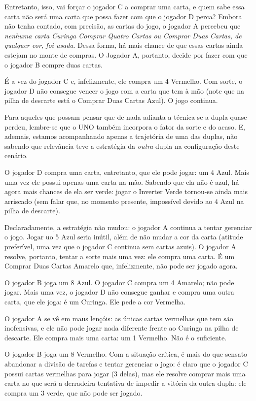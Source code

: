 Entretanto, isso, vai forçar o jogador C a comprar uma carta, e quem sabe essa carta não será uma carta que possa fazer com que o jogador D perca? Embora não tenha contado, com precisão, as cartas do jogo, o jogador A percebeu que \emph{nenhuma carta Curinga Comprar Quatro Cartas ou Comprar Duas Cartas, de qualquer cor, foi usada}. Dessa forma, há mais chance de que essas cartas ainda estejam no monte de compras. O Jogador A, portanto, decide por fazer com que o jogador B compre duas cartas.

É a vez do jogador C e, infelizmente, ele compra um 4 Vermelho. Com sorte, o jogador D não consegue vencer o jogo com a carta que tem à mão (note que na pilha de descarte está o Comprar Duas Cartas Azul). O jogo continua.

Para aqueles que possam pensar que de nada adianta a técnica se a dupla quase perdeu, lembre-se que o UNO também incorpora o fator da sorte e do acaso. E, ademais, estamos acompanhando apenas a trajetória de uma das duplas, não sabendo que relevância teve a estratégia da \emph{outra} dupla na configuração deste cenário.

O jogador D compra uma carta, entretanto, que ele pode jogar: um 4 Azul. Mais uma vez ele possui apenas uma carta na mão. Sabendo que ela não é azul, há agora mais chances de ela ser verde: jogar o Inverter Verde tornou-se ainda mais arriscado (sem falar que, no momento presente, impossível devido ao 4 Azul na pilha de descarte).

Declaradamente, a estratégia não mudou: o jogador A continua a tentar gerenciar o jogo. Jogar uo 5 Azul seria inútil, além de não mudar a cor da carta (atitude preferível, uma vez que o jogador C continua sem cartas azuis). O jogador A resolve, portanto, tentar a sorte mais uma vez: ele compra uma carta. É um Comprar Duas Cartas Amarelo que, infelizmente, não pode ser jogado agora.

O jogador B joga um 8 Azul. O jogador C compra um 4 Amarelo; não pode jogar. Mais uma vez, o jogador D não consegue ganhar e compra uma outra carta, que ele joga: é um Curinga. Ele pede a cor Vermelha.

O jogador A se vê em maus lençóis: as únicas cartas vermelhas que tem são inofensivas, e ele não pode jogar nada diferente frente ao Curinga na pilha de descarte. Ele compra mais uma carta: um 1 Vermelho. Não é o suficiente.

O jogador B joga um 8 Vermelho. Com a situação crítica, é mais do que sensato abandonar a divisão de tarefas e tentar gerenciar o jogo: é claro que o jogador C possui cartas vermelhas para jogar (3 delas), mas ele resolve comprar mais uma carta no que será a derradeira tentativa de impedir a vitória da outra dupla: ele compra um 3 verde, que não pode ser jogado.

